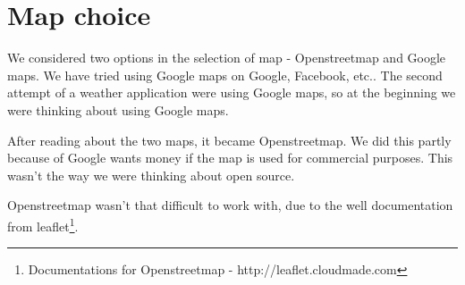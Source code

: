 \chapter{Map choice}
We considered two options in the selection of map - Openstreetmap and Google maps. We have tried using Google maps on Google, Facebook, etc.. The second attempt of a weather application were using Google maps, so at the beginning we were thinking about using Google maps.

After reading about the two maps, it became Openstreetmap. We did this partly because of Google wants money if the map is used for commercial purposes. This wasn't the way we were thinking about open source.

Openstreetmap wasn't that difficult to work with, due to the well documentation from leaflet\footnote{Documentations for Openstreetmap - http://leaflet.cloudmade.com}.